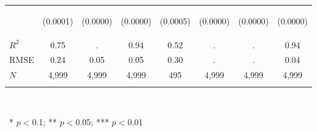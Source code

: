 \begin{center}
\begin{tabular}{lccccccc}
 & \begin{footnotesize}(0.0001)\end{footnotesize} & \begin{footnotesize}(0.0000)\end{footnotesize} & \begin{footnotesize}(0.0000)\end{footnotesize} & \begin{footnotesize}(0.0005)\end{footnotesize} & \begin{footnotesize}(0.0000)\end{footnotesize} & \begin{footnotesize}(0.0000)\end{footnotesize} & \begin{footnotesize}(0.0000)\end{footnotesize}\\
\noalign{\smallskip}$R^2$ & 0.75 & . & 0.94 & 0.52 & . & . & 0.94\\
RMSE & 0.24 & 0.05 & 0.05 & 0.30 & . & . & 0.04\\
$N$ & 4,999 & 4,999 & 4,999 & 495 & 4,999 & 4,999 & 4,999\\
\noalign{\smallskip}\hline\end{tabular}\\
\smallskip\begin{footnotesize}\ * $p<0$.1; ** $p<0$.05; *** $p<0$.01\end{footnotesize}\\
\smallskip
\end{center}
